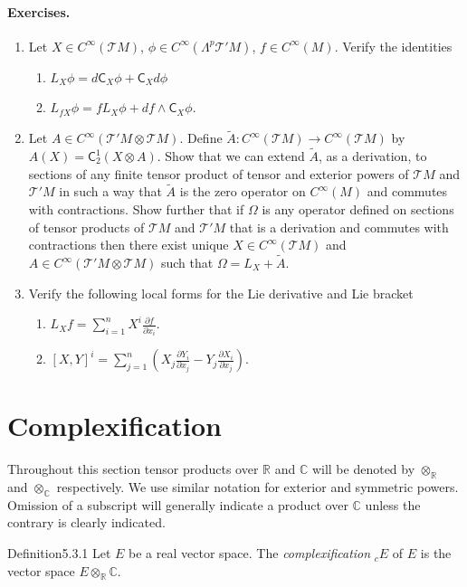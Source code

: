 \paragraph{Exercises.}
\begin{enumerate}
\item Let $X\in C^\infty(\mathcal T M)$, $\phi\in C^\infty(\Lambda^p\mathcal T'M)$, $f\in C^\infty(M)$. Verify the identities
\begin{enumerate}[label=\roman*)]
\item $L_X\phi=d\mathsf C_X\phi+\mathsf C_Xd\phi$
\item $L_{fX}\phi=fL_X\phi+df\wedge\mathsf C_X\phi$.
\end{enumerate}
\item Let $A\in C^\infty(\mathcal T'M\otimes\mathcal T M)$. Define $\widetilde A:C^\infty(\mathcal T M)\to C^\infty(\mathcal T M)$ by $A(X)=\mathsf C_2^1(X\otimes A)$. Show that we can extend $\widetilde A$, as a derivation, to sections of any finite tensor product of tensor and exterior powers of $\mathcal T M$ and $\mathcal T'M$ in such a way that $\widetilde A$ is the zero operator on $C^\infty(M)$ and commutes with contractions. Show further that if $\Omega$ is any operator defined on sections of tensor
products of $\mathcal T M$ and $\mathcal T'M$ that is a derivation and commutes with contractions then there exist unique $X\in C^\infty(\mathcal T M)$ and $A\in C^\infty(\mathcal T'M\otimes\mathcal T M)$ such that $\Omega=L_X+\widetilde A$.
\item Verify the following local forms for the Lie derivative and Lie bracket
\begin{enumerate}[label=\alph*)]
\item $\displaystyle L_X f=\sum_{i=1}^n X^i\frac{\partial f}{\partial x_i}$.
\item $\displaystyle [X,Y]^i=\sum_{j=1}^n\left(X_j\frac{\partial Y_i}{\partial x_j}-Y_j\frac{\partial X_i}{\partial x_j}\right)$.
\end{enumerate}
\end{enumerate}
\section{Complexification}\label{sec:5:3}
Throughout this section tensor products over $\mathbb R$ and $\mathbb C$ will be denoted by $\otimes_{\mathbb R}$ and $\otimes_{\mathbb C}$ respectively. We use similar notation for exterior and symmetric powers. Omission of a subscript will generally indicate a product over $\mathbb C$ unless the contrary is clearly indicated.
\begin{originaltheorem}{Definition}{5.3.1}
Let $E$ be a real vector space. The \emph{complexification} ${}_cE$ of $E$ is the vector space $E\otimes_{\mathbb R}\mathbb C$.
\end{originaltheorem}
